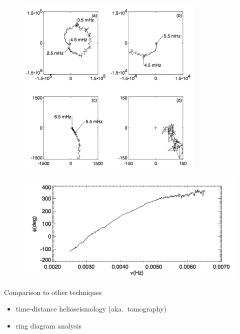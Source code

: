 \documentclass{beamer}
\begin{document}
\begin{frame}
    \begin{figure}
        \includegraphics[width=0.8\textwidth]{fig_10.png}
    \end{figure}
\end{frame}

\begin{frame}
    \begin{figure}
        \includegraphics[width=\textwidth]{fig_11.png}
    \end{figure}
\end{frame}

\begin{frame}{Comparison to other techniques}
    \begin{itemize}
        \item time-distance helioseismology
            (aka.\ tomography)
        \item ring diagram analysis
    \end{itemize}
\end{frame}
\end{document}
